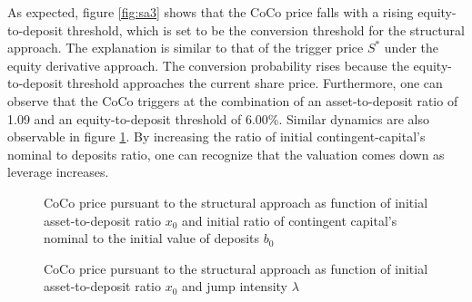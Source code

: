 As expected, figure \ref{fig:sa3} shows that the CoCo price falls with a rising equity-to-deposit threshold, which is set to be the conversion threshold for the structural approach. The explanation is similar to that of the trigger price $S^*$ under the equity  derivative approach. The conversion probability rises because the equity-to-deposit threshold approaches the current share price. Furthermore, one can observe that the CoCo triggers at the combination of an asset-to-deposit ratio of 1.09 and an equity-to-deposit threshold of 6.00\%. Similar dynamics are also observable in figure \ref{fig:sa5}. By increasing the ratio of initial contingent-capital's nominal to deposits ratio, one can recognize that the valuation comes down as leverage increases. 

\begin{figure}[H]
\centering
    \caption[CoCo price pursuant to the structural approach as function of asset-to-deposit ratio and ratio of contingent capital's nominal to deposits]{CoCo price pursuant to the structural approach as function of initial asset-to-deposit ratio $x_0$ and initial ratio of contingent capital's nominal to the initial value of deposits $b_0$}
  \label{fig:sa5}
  \end{figure}

\begin{figure}[H]
\centering
    \caption[CoCo price pursuant to the structural approach as function of asset-to-deposit ratio and jump intensity]{CoCo price pursuant to the structural approach as function of initial asset-to-deposit ratio $x_0$ and jump intensity $\lambda$}
  \label{fig:sa4}
  \end{figure}
  
